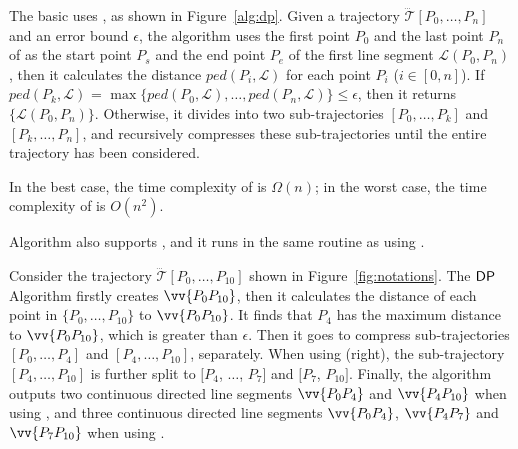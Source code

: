 The basic \dpa uses \ped, as shown in Figure~\ref{alg:dp}.
Given a trajectory $\dddot{\mathcal{T}}[P_0, \ldots, P_n]$ and an error bound $\epsilon$, the algorithm uses the first point $P_0$ and the last point $P_n$ of  as the start point $P_s$ and the end point $P_e$ of the first line segment $\mathcal{L}(P_0, P_n)$, then it calculates the distance $ped(P_i, {\mathcal{L}})$ for each point $P_i$ ($i\in[0,n]$). If $ped(P_k, {\mathcal{L}})$ = $\max \{ped(P_0, {\mathcal{L}}), \ldots, ped(P_n, {\mathcal{L}}) \} \le \epsilon$, then it returns $\{\mathcal{L}(P_0,P_n)\}$. Otherwise, it divides  into two sub-trajectories $[P_0, \ldots, P_k]$ and $[P_{k}, \ldots, P_n]$, and recursively compresses these sub-trajectories until the entire trajectory has been considered.

In the best case, the time complexity of \dpa is $\Omega(n)$; in the worst case, the time complexity of \dpa is $O(n^2)$.

Algorithm \dpa also supports \sed \cite{Meratnia:Spatiotemporal}, and it runs in the same routine as using \ped. %






\begin{example}
\label{exm-alg-lsa}
Consider the trajectory $\dddot{\mathcal{T}}[P_0,\ldots,P_{10}]$ shown in Figure~\ref{fig:notations}.
The ${\mathsf{DP}}$ Algorithm firstly creates $\vv{P_0P_{10}}$, then it calculates the distance of each point in $\{P_0,\ldots,P_{10}\}$ to $\vv{P_0P_{10}}$.
It finds that $P_{4}$ has the maximum distance to $\vv{P_0P_{10}}$, which is greater than $\epsilon$. Then it goes to compress sub-trajectories $[P_0, \ldots, P_{4}]$ and $[P_{4}, \ldots, P_{10}]$, separately.
When using \sed (right), the sub-trajectory $[P_4,\ldots, P_{10}]$ is further split to $[P_4$, $\ldots$, $P_7]$ and $[P_7$, $P_{10}]$.
Finally, the algorithm outputs two continuous directed line segments $\vv{P_0P_4}$ and $\vv{P_4P_{10}}$ when using \ped, and three continuous directed line segments $\vv{P_0P_4}$, $\vv{P_4P_7}$ and $\vv{P_7P_{10}}$ when using \sed.
\end{example}


